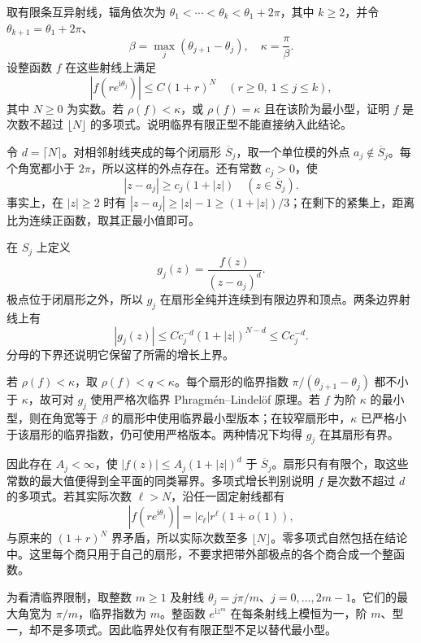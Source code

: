\begin{exercise}[射线上的多项式控制]\label{b3:ex:19-draft-07}
取有限条互异射线，辐角依次为 \(\theta_1<\cdots<\theta_k<\theta_1+2\pi\)，其中 \(k\ge2\)，并令 \(\theta_{k+1}=\theta_1+2\pi\)、
\[
 \beta=\max_j(\theta_{j+1}-\theta_j),\quad \kappa=\frac\pi\beta.
\]
设整函数 \(f\) 在这些射线上满足
\[
 |f(re^{\mathrm i\theta_j})|\le C(1+r)^N
 \quad(r\ge0,\ 1\le j\le k),
\]
其中 \(N\ge0\) 为实数。若 \(\rho(f)<\kappa\)，或 \(\rho(f)=\kappa\) 且在该阶为最小型，证明 \(f\) 是次数不超过 \(\lfloor N\rfloor\) 的多项式。说明临界有限正型不能直接纳入此结论。
\end{exercise}
\begin{solution}
令 \(d=\lceil N\rceil\)。对相邻射线夹成的每个闭扇形 \(\overline S_j\)，取一个单位模的外点 \(a_j\notin\overline S_j\)。每个角宽都小于 \(2\pi\)，所以这样的外点存在。还有常数 \(c_j>0\)，使
\[
 |z-a_j|\ge c_j(1+|z|)\quad(z\in\overline S_j).
\]
事实上，在 \(|z|\ge2\) 时有 \(|z-a_j|\ge|z|-1\ge(1+|z|)/3\)；在剩下的紧集上，距离比为连续正函数，取其正最小值即可。

在 \(S_j\) 上定义
\[
 g_j(z)=\frac{f(z)}{(z-a_j)^d}.
\]
极点位于闭扇形之外，所以 \(g_j\) 在扇形全纯并连续到有限边界和顶点。两条边界射线上有
\[
 |g_j(z)|\le Cc_j^{-d}(1+|z|)^{N-d}\le Cc_j^{-d}.
\]
分母的下界还说明它保留了所需的增长上界。

若 \(\rho(f)<\kappa\)，取 \(\rho(f)<q<\kappa\)。每个扇形的临界指数 \(\pi/(\theta_{j+1}-\theta_j)\) 都不小于 \(\kappa\)，故可对 \(g_j\) 使用严格次临界 Phragmén--Lindelöf 原理。若 \(f\) 为阶 \(\kappa\) 的最小型，则在角宽等于 \(\beta\) 的扇形中使用临界最小型版本；在较窄扇形中，\(\kappa\) 已严格小于该扇形的临界指数，仍可使用严格版本。两种情况下均得 \(g_j\) 在其扇形有界。

因此存在 \(A_j<\infty\)，使 \(|f(z)|\le A_j(1+|z|)^d\) 于 \(\overline S_j\)。扇形只有有限个，取这些常数的最大值便得到全平面的同类幂界。多项式增长判别说明 \(f\) 是次数不超过 \(d\) 的多项式。若其实际次数 \(\ell>N\)，沿任一固定射线都有
\[
 |f(re^{\mathrm i\theta_j})|=|c_\ell|r^\ell(1+o(1)),
\]
与原来的 \((1+r)^N\) 界矛盾，所以实际次数至多 \(\lfloor N\rfloor\)。零多项式自然包括在结论中。这里每个商只用于自己的扇形，不要求把带外部极点的各个商合成一个整函数。

为看清临界限制，取整数 \(m\ge1\) 及射线 \(\theta_j=j\pi/m\)、\(j=0,\ldots,2m-1\)。它们的最大角宽为 \(\pi/m\)，临界指数为 \(m\)。整函数 \(e^{\mathrm iz^m}\) 在每条射线上模恒为一，阶 \(m\)、型一，却不是多项式。因此临界处仅有有限正型不足以替代最小型。
\end{solution}

